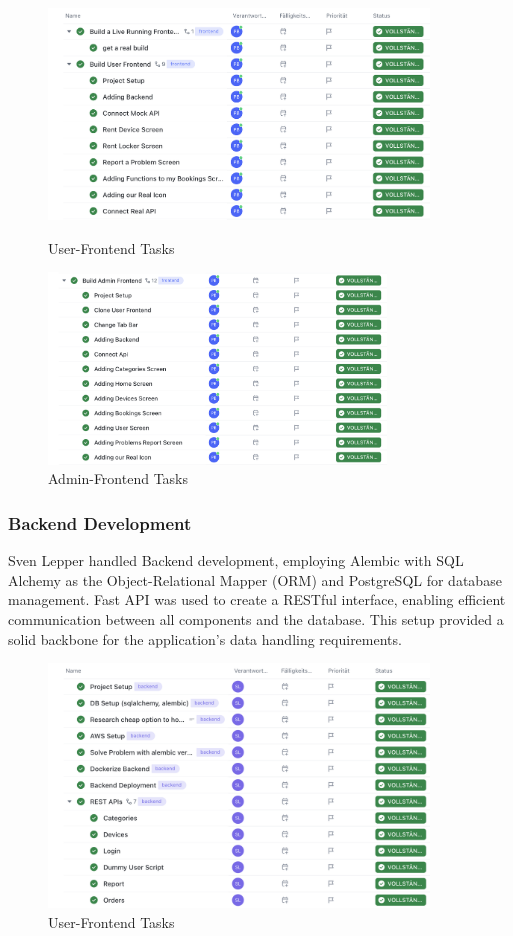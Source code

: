 \begin{figure}[htbp]
    \centering
    \includegraphics[width=0.9\textwidth]{images/user-frontend.png}
    \caption{User-Frontend Tasks}
    \label{fig:myimage}
    \vspace{1cm}
    \includegraphics[width=0.8\textwidth]{images/admin-frontend.png}
    \caption{Admin-Frontend Tasks}
    \label{fig:myimage}
\end{figure}
\clearpage
\subsubsection{Backend Development}
Sven Lepper handled Backend development, employing Alembic with SQL Alchemy as the Object-Relational Mapper (ORM) and PostgreSQL for database management. Fast API was used to create a RESTful interface, enabling efficient communication between all components and the database. This setup provided a solid backbone for the application's data handling requirements.

\begin{figure}[h]
    \centering
    \includegraphics[width=0.9\textwidth]{images/backend.png}
    \caption{User-Frontend Tasks}
    \label{fig:myimage}
\end{figure}
\clearpage
